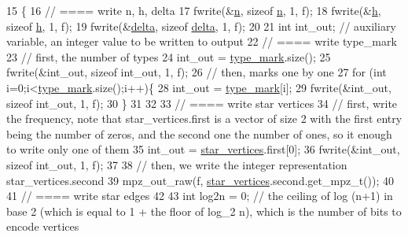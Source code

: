 \begin{DoxyCode}
15                                                  \{
16   \textcolor{comment}{// ==== write n, h, delta}
17   fwrite(&\hyperlink{classmarked__graph__compressed_a8d841016ddb11cfd33748c8deb6277ba}{n}, \textcolor{keyword}{sizeof} \hyperlink{classmarked__graph__compressed_a8d841016ddb11cfd33748c8deb6277ba}{n}, 1, f);
18   fwrite(&\hyperlink{classmarked__graph__compressed_af6ff623407b673d08d0cab77b39c2193}{h}, \textcolor{keyword}{sizeof} \hyperlink{classmarked__graph__compressed_af6ff623407b673d08d0cab77b39c2193}{h}, 1, f);
19   fwrite(&\hyperlink{classmarked__graph__compressed_a8b2aaac68e9332ddc78d88eb60b323a7}{delta}, \textcolor{keyword}{sizeof} \hyperlink{classmarked__graph__compressed_a8b2aaac68e9332ddc78d88eb60b323a7}{delta}, 1, f);
20 
21   \textcolor{keywordtype}{int} int\_out; \textcolor{comment}{// auxiliary variable, an integer value to be written to output}
22   \textcolor{comment}{// ==== write type\_mark}
23   \textcolor{comment}{// first, the number of types}
24   int\_out = \hyperlink{classmarked__graph__compressed_a86b00223525703e973415cbc9c94da68}{type\_mark}.size();
25   fwrite(&int\_out, \textcolor{keyword}{sizeof} int\_out, 1, f);
26   \textcolor{comment}{// then, marks one by one}
27   \textcolor{keywordflow}{for} (\textcolor{keywordtype}{int} i=0;i<\hyperlink{classmarked__graph__compressed_a86b00223525703e973415cbc9c94da68}{type\_mark}.size();i++)\{
28     int\_out = \hyperlink{classmarked__graph__compressed_a86b00223525703e973415cbc9c94da68}{type\_mark}[i];
29     fwrite(&int\_out, \textcolor{keyword}{sizeof} int\_out, 1, f);
30   \}
31 
32 
33   \textcolor{comment}{// ==== write star vertices}
34   \textcolor{comment}{// first, write the frequency, note that star\_vertices.first is a vector of size 2 with the first entry
       being the number of zeros, and the second one the number of ones, so it enough to write only one of them}
35   int\_out = \hyperlink{classmarked__graph__compressed_a7a4ced4586e2e353f9076bd447df5208}{star\_vertices}.first[0];
36   fwrite(&int\_out, \textcolor{keyword}{sizeof} int\_out, 1, f);
37 
38   \textcolor{comment}{// then, we write the integer representation star\_vertices.second}
39   mpz\_out\_raw(f, \hyperlink{classmarked__graph__compressed_a7a4ced4586e2e353f9076bd447df5208}{star\_vertices}.second.get\_mpz\_t());
40 
41   \textcolor{comment}{// ==== write star edges}
42 
43   \textcolor{keywordtype}{int} log2n = 0; \textcolor{comment}{// the ceiling of log (n+1) in base 2 (which is equal to 1 + the floor of log\_2 n), which
       is the number of bits to encode vertices}

\end{DoxyCode}
